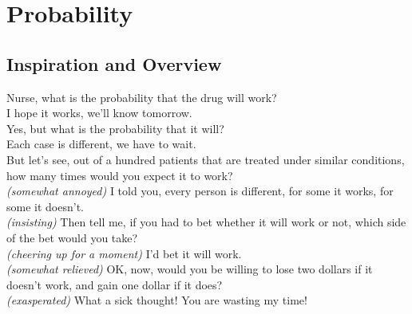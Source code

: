 \chapter{Probability}

\section{Inspiration and Overview}
\begin{examplebox}
\begin{dialogue}
 Nurse, what is the probability that the drug will work? \\
 I hope it works, we'll know tomorrow. \\
 Yes, but what is the probability that it will? \\ 
 Each case is different, we have to wait. \\
 But let's see, out of a hundred patients that are treated under similar conditions, how many times would you expect it to work? \\
 \emph{(somewhat annoyed)} I told you, every person is different, for some it works, for some it doesn't. \\
 \emph{(insisting)} Then tell me, if you had to bet whether it will work or not, which side of the bet would you take? \\
 \emph{(cheering up for a moment)} I'd bet it will work. \\
 \emph{(somewhat relieved)} OK, now, would you be willing to lose two dollars if it doesn't work, and gain one dollar if it does? \\
 \emph{(exasperated)} What a sick thought! You are wasting my time!
\end{dialogue}
\end{examplebox}


